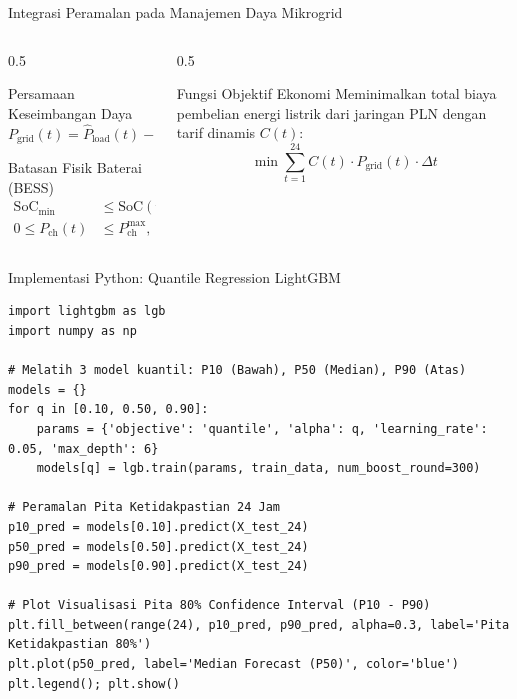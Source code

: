\documentclass[aspectratio=169, 10pt]{beamer}
\begin{document}
\begin{frame}{Integrasi Peramalan pada Manajemen Daya Mikrogrid}
    \begin{columns}[T]
        \begin{column}{0.5\textwidth}
            \begin{block}{Persamaan Keseimbangan Daya}
                \begin{equation}
                    P_{\text{grid}}(t) = \hat{P}_{\text{load}}(t) - \hat{P}_{\text{PV}}(t) + P_{\text{ch}}(t) - P_{\text{dis}}(t)
                \end{equation}
            \end{block}
            \begin{block}{Batasan Fisik Baterai (BESS)}
                \begin{align*}
                    \text{SoC}_{\min} &\le \text{SoC}(t) \le \text{SoC}_{\max} \\
                    0 \le P_{\text{ch}}(t) &\le P_{\text{ch}}^{\max}, \quad 0 \le P_{\text{dis}}(t) \le P_{\text{dis}}^{\max}
                \end{align*}
            \end{block}
        \end{column}
        \begin{column}{0.5\textwidth}
            \begin{block}{Fungsi Objektif Ekonomi}
                Meminimalkan total biaya pembelian energi listrik dari jaringan PLN dengan tarif dinamis $C(t)$:
                \begin{equation}
                    \min \sum_{t=1}^{24} C(t) \cdot P_{\text{grid}}(t) \cdot \Delta t
                \end{equation}
            \end{block}
        \end{column}
    \end{columns}
\end{frame}

\begin{frame}[fragile]{Implementasi Python: Quantile Regression LightGBM}
\begin{lstlisting}
import lightgbm as lgb
import numpy as np

# Melatih 3 model kuantil: P10 (Bawah), P50 (Median), P90 (Atas)
models = {}
for q in [0.10, 0.50, 0.90]:
    params = {'objective': 'quantile', 'alpha': q, 'learning_rate': 0.05, 'max_depth': 6}
    models[q] = lgb.train(params, train_data, num_boost_round=300)

# Peramalan Pita Ketidakpastian 24 Jam
p10_pred = models[0.10].predict(X_test_24)
p50_pred = models[0.50].predict(X_test_24)
p90_pred = models[0.90].predict(X_test_24)

# Plot Visualisasi Pita 80% Confidence Interval (P10 - P90)
plt.fill_between(range(24), p10_pred, p90_pred, alpha=0.3, label='Pita Ketidakpastian 80%')
plt.plot(p50_pred, label='Median Forecast (P50)', color='blue')
plt.legend(); plt.show()
\end{lstlisting}
\end{frame}
\end{document}
